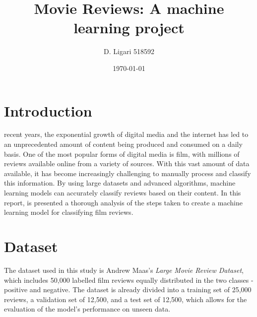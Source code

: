 \documentclass[eng]{class}
\title{Movie Reviews: A machine learning project}
\author[1]{D. Ligari 518592}
\affil[1]{University of Pavia, Department of Computer Engineering (Data Science), Pavia, Italy}
\date{\today}
\begin{document}
\maketitle
\thispagestyle{FirstPage}
\section{Introduction}
recent years, the exponential growth of digital media and the internet has led to an unprecedented amount of content being produced and consumed on a daily basis.
One of the most popular forms of digital media is film, with millions of reviews available online from a variety of sources. With this vast amount of data available,
it has become increasingly challenging to manually process and classify this information.
By using large datasets and advanced algorithms, machine learning models can accurately classify reviews based on their content.
In this report, is presented a thorough analysis of the steps taken to create a machine learning model for classifying film reviews.
\section{Dataset}
The dataset used in this study is Andrew Maas's \textit{Large Movie Review Dataset},
which includes 50,000 labelled film reviews equally distributed in the two classes - positive and negative.
The dataset is already divided into a training set of 25,000 reviews, a validation set of 12,500, and a test set of 12,500,
which allows for the evaluation of the model's performance on unseen data.
\end{document}
